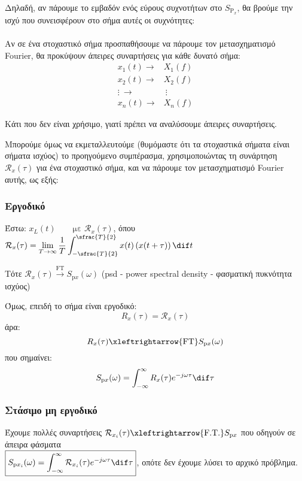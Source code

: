\documentclass[11pt,a4paper,notitlepage,fleqn,final]{article}
\begin{document}
Δηλαδή, αν πάρουμε το εμβαδόν ενός εύρους συχνοτήτων στο
\(  S_{\mathrm P_{x}} \), θα βρούμε την ισχύ που συνεισφέρουν στο
σήμα αυτές οι συχνότητες:

\paragraph{}
Αν σε ένα στοχαστικό σήμα προσπαθήσουμε να πάρουμε τον μετασχηματισμό
Fourier, θα προκύψουν άπειρες συναρτήσεις για κάθε δυνατό σήμα:
\begin{align*}
	x_1(t) \xrightarrow{\quad} & X_1(f) \\
	x_2(t) \xrightarrow{\quad} & X_2(f) \\
	\vdots\ \xrightarrow{\quad} & \ \vdots \\
	x_n(t) \xrightarrow{\quad} & X_n(f)
\end{align*}

Κάτι που δεν είναι χρήσιμο, γιατί πρέπει να αναλύσουμε άπειρες
συναρτήσεις.

Μπορούμε όμως να εκμεταλλευτούμε (θυμόμαστε ότι τα στοχαστικά σήματα
είναι σήματα ισχύος) το προηγούμενο συμπέρασμα, χρησιμοποιώντας τη συνάρτηση \( \mathcal{R}_x(\tau) \) για ένα στοχαστικό σήμα,
και να πάρουμε τον μετασχηματισμό Fourier αυτής, ως εξής:

\subsubsection{Εργοδικό}
Έστω: \( x_L(t) \qquad \text{με } \mathcal{R}_x(\tau) \), όπου
\( \displaystyle \mathcal{R}_x(\tau) 
= \lim_{T\to \infty} \frac{1}{T}
\int_{-\sfrac{T}{2} }^{\sfrac{T}{2} }x(t)\left(x(t+\tau)\right)\dif t
\)

Τότε \( \mathcal{R}_x(\tau)
\xrightarrow{\text{FT}} S_{\mathrm px}(\omega ) \)
(psd - power spectral density - φασματική πυκνότητα ισχύος)

Όμως, επειδή το σήμα είναι εργοδικό:
\[
R_x(\tau) = \mathcal R_x(\tau)
\]
άρα:
\[
R_x(\tau) \xleftrightarrow{\mathrm{FT}} S_{\mathrm{p}x}(\omega )
\]
που σημαίνει:
\[
S_{\mathrm p x}(\omega ) = \int_{-\infty}^{\infty}
R_x(\tau)e^{-j\omega \tau}\dif\tau
\]

\subsubsection{Στάσιμο μη εργοδικό}
Έχουμε πολλές συναρτήσεις \( \mathcal{R}_{x_i}(\tau)
\xleftrightarrow{\text{F.T.}} S_{\mathrm p x}
 \) που οδηγούν σε άπειρα φάσματα \\
\( \displaystyle \boxed{S_{\mathrm p x_i}(\omega ) =
	 \int_{-\infty}^{\infty}
\mathcal{R}_{x_i}(\tau) e^{-j\omega \tau}\dif \tau} \), οπότε δεν
έχουμε λύσει το αρχικό πρόβλημα.
\end{document}
